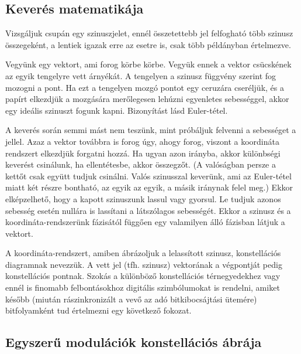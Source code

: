 \documentclass[12pt,a4paper]{article}
\begin{document}
\subsection{Keverés matematikája}
Vizsgáljuk csupán egy szinuszjelet, ennél összetettebb jel felfogható több szinusz összegeként, a lentiek igazak erre az esetre is, csak több példányban értelmezve.
\par
Vegyünk egy vektort, ami forog körbe körbe. Vegyük ennek a vektor csücskének az egyik tengelyre vett árnyékát. A tengelyen a szinusz függvény szerint fog mozogni a pont. Ha ezt a tengelyen mozgó pontot egy ceruzára cseréljük, és a papírt elkezdjük a mozgására merőlegesen lehúzni egyenletes sebességgel, akkor egy ideális szinuszt fogunk kapni. Bizonyítást lásd Euler-tétel.
\par
A keverés során semmi mást nem teszünk, mint próbáljuk felvenni a sebességet a jellel. Azaz a vektor továbbra is forog úgy, ahogy forog, viszont a koordináta rendszert elkezdjük forgatni hozzá. Ha ugyan azon irányba, akkor különbségi keverést csinálunk, ha ellentétesbe, akkor összegzőt. (A valóságban persze a kettőt csak együtt tudjuk csinálni. Valós szinusszal keverünk, ami az Euler-tétel miatt két részre bontható, az egyik az egyik, a másik iránynak felel meg.) Ekkor elképzelhető, hogy a kapott szinuszunk lassul vagy gyorsul. Le tudjuk azonos sebesség esetén nullára is lassítani a látszólagos sebességét. Ekkor a szinusz és a koordináta-rendszerünk fázisától függően egy valamilyen álló fázisban látjuk a vektort.
\par
A koordináta-rendszert, amiben ábrázoljuk a lelassított szinusz, konstellációs diagramnak nevezzük. A vett jel (tfh. szinusz) vektorának a végpontját pedig konstellációs pontnak. Szokás a különböző konstellációs térnegyedekhez vagy ennél is finomabb felbontásokhoz digitális szimbólumokat is rendelni, amiket később (miután rászinkronizált a vevő az adó bitkibocsájtási ütemére) bitfolyamként tud értelmezni egy következő fokozat.

\subsection{Egyszerű modulációk konstellációs ábrája}
\end{document}
